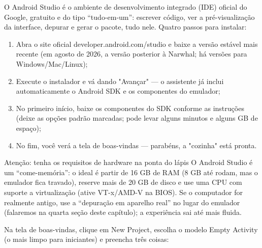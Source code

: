 


O Android Studio é o ambiente de desenvolvimento integrado (IDE) oficial do Google, gratuito e do tipo “tudo-em-um”: escrever código, ver a pré-visualização da interface, depurar e gerar o pacote, tudo nele. Quatro passos para instalar:

\begin{enumerate}
  \item Abra o site oficial developer.android.com/studio e baixe a versão estável mais recente (em agosto de 2026, a versão posterior à Narwhal; há versões para Windows/Mac/Linux);
  \item Execute o instalador e vá dando "Avançar" — o assistente já inclui automaticamente o Android SDK e os componentes do emulador;
  \item No primeiro início, baixe os componentes do SDK conforme as instruções (deixe as opções padrão marcadas; pode levar alguns minutos e alguns GB de espaço);
  \item No fim, você verá a tela de boas-vindas — parabéns, a "cozinha" está pronta.
\end{enumerate}

\begin{tcbwarn}{Atenção: tenha os requisitos de hardware na ponta do lápis}
O Android Studio é um “come-memória”: o ideal é partir de 16 GB de RAM (8 GB até rodam, mas o emulador fica travado), reserve mais de 20 GB de disco e use uma CPU com suporte a virtualização (ative VT-x/AMD-V na BIOS). Se o computador for realmente antigo, use a “depuração em aparelho real” no lugar do emulador (falaremos na quarta seção deste capítulo); a experiência sai até mais fluida.

\end{tcbwarn}


Na tela de boas-vindas, clique em New Project, escolha o modelo Empty Activity (o mais limpo para iniciantes) e preencha três coisas:

